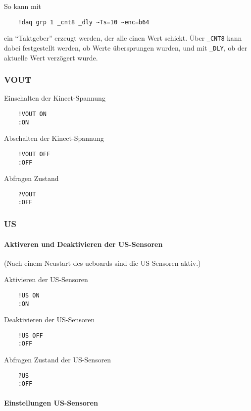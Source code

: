 So kann mit
\begin{verbatim}
	!daq grp 1 _cnt8 _dly ~Ts=10 ~enc=b64
\end{verbatim}
ein "`Taktgeber"' erzeugt werden, der alle  einen Wert schickt. Über \verb|_CNT8| kann dabei festgestellt werden, ob Werte übersprungen wurden, und mit \verb|_DLY|, ob der aktuelle Wert verzögert wurde.



\subsubsection{VOUT}

Einschalten der Kinect-Spannung
\begin{verbatim}
	!VOUT ON
	:ON
\end{verbatim}

Abschalten der Kinect-Spannung
\begin{verbatim}
	!VOUT OFF
	:OFF
\end{verbatim}


Abfragen Zustand
\begin{verbatim}
	?VOUT
	:OFF
\end{verbatim}




\subsubsection{US}

\paragraph{Aktiveren und Deaktivieren der US-Sensoren}

(Nach einem Neustart des ucboards sind die US-Sensoren aktiv.)

Aktivieren der US-Sensoren
\begin{verbatim}
	!US ON
	:ON
\end{verbatim}

Deaktivieren der US-Sensoren
\begin{verbatim}
	!US OFF
	:OFF
\end{verbatim}


Abfragen Zustand der US-Sensoren
\begin{verbatim}
	?US
	:OFF
\end{verbatim}


\paragraph{Einstellungen US-Sensoren}


